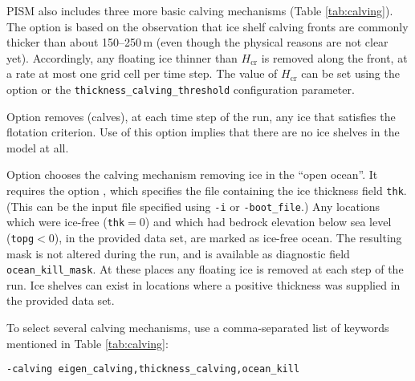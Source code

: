 PISM also includes three more basic calving mechanisms (Table \ref{tab:calving}). The option  is based on the observation that ice shelf calving fronts are commonly thicker than about 150--250\,m (even though the physical reasons are not clear yet). Accordingly, any floating ice thinner than $H_{\textrm{cr}}$ is removed along the front, at a rate at most one grid cell per time step. The value of $H_{\mathrm{cr}}$ can be set using the  option or the \texttt{thickness_calving_threshold} configuration parameter.

Option  removes (calves), at each time step of the run, any ice that satisfies the flotation criterion.  Use of this option implies that there are no ice shelves in the model at all.

Option  chooses the calving mechanism removing ice in the ``open ocean''. It requires the option , which specifies the file containing the ice thickness field \texttt{thk}. (This can be the input file specified using \texttt{-i} or \texttt{-boot_file}.) Any locations which were ice-free (\texttt{thk}$=0$) and which had bedrock elevation below sea level (\texttt{topg}$<0$), in the provided data set, are marked as ice-free ocean.  The resulting mask is not altered during the run, and is available as diagnostic field \texttt{ocean_kill_mask}.  At these places any floating ice is removed at each step of the run.  Ice shelves can exist in locations where a positive thickness was supplied in the provided data set.

To select several calving mechanisms, use a comma-separated list of keywords mentioned in Table \ref{tab:calving}:
\begin{verbatim}
-calving eigen_calving,thickness_calving,ocean_kill
\end{verbatim}

